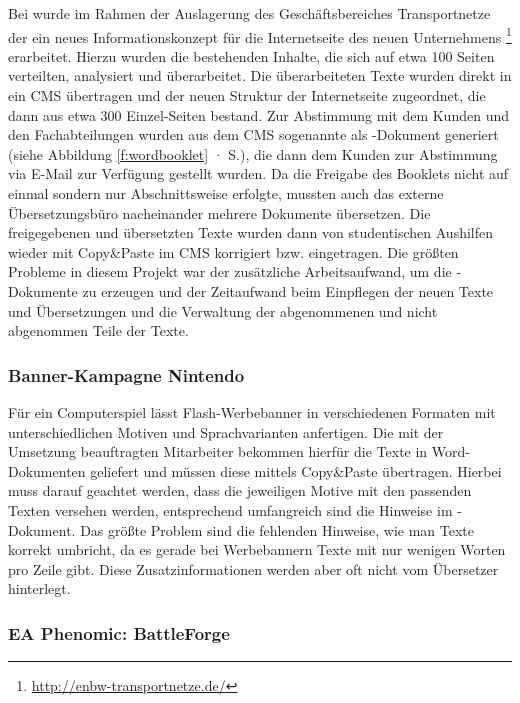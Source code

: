 Bei  wurde im Rahmen der Auslagerung des Geschäftsbereiches Transportnetze der  ein neues Informationskonzept für die Internetseite des neuen Unternehmens \footnote{\url{http://enbw-transportnetze.de/}} erarbeitet. Hierzu wurden die bestehenden Inhalte, die sich auf etwa 100 Seiten verteilten, analysiert und überarbeitet. Die überarbeiteten Texte wurden direkt in ein CMS übertragen und der neuen Struktur der Internetseite zugeordnet, die dann aus etwa 300 Einzel-Seiten bestand. Zur Abstimmung mit dem Kunden und den Fachabteilungen wurden aus dem CMS sogenannte  als -Dokument generiert (siehe Abbildung \ref{f:wordbooklet} · S.\pageref{f:wordbooklet}), die dann dem Kunden zur Abstimmung via E-Mail zur Verfügung gestellt wurden. Da die Freigabe des Booklets nicht auf einmal sondern nur Abschnittsweise erfolgte, mussten auch das externe Übersetzungsbüro nacheinander mehrere Dokumente übersetzen. Die freigegebenen und übersetzten Texte wurden dann von studentischen Aushilfen wieder mit Copy\&Paste im CMS korrigiert bzw. eingetragen. Die größten Probleme in diesem Projekt war der zusätzliche Arbeitsaufwand, um die -Dokumente zu erzeugen und der Zeitaufwand beim Einpflegen der neuen Texte und Übersetzungen und die Verwaltung der abgenommenen und nicht abgenommen Teile der Texte.

\subsubsection{Banner-Kampagne Nintendo}

Für ein Computerspiel lässt  Flash-Werbebanner in verschiedenen Formaten mit unterschiedlichen Motiven und Sprachvarianten anfertigen. Die mit der Umsetzung beauftragten Mitarbeiter bekommen hierfür die Texte in Word-Dokumenten geliefert und müssen diese mittels Copy\&Paste übertragen. Hierbei muss darauf geachtet werden, dass die jeweiligen Motive mit den passenden Texten versehen werden, entsprechend umfangreich sind die Hinweise im -Dokument. Das größte Problem sind die fehlenden Hinweise, wie man Texte korrekt umbricht, da es gerade bei Werbebannern Texte mit nur wenigen Worten pro Zeile gibt. Diese Zusatzinformationen werden aber oft nicht vom Übersetzer hinterlegt.

\subsubsection{EA Phenomic: BattleForge}

